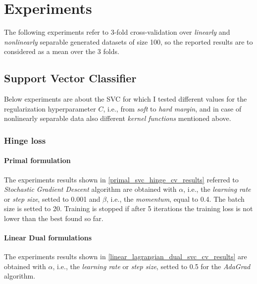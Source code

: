 \section{Experiments}

The following experiments refer to 3-fold cross-validation over \emph{linearly} and \emph{nonlinearly} separable generated datasets of size 100, so the reported results are to considered as a mean over the 3 folds.

\subsection{Support Vector Classifier}

Below experiments are about the SVC for which I tested different values for the regularization hyperparameter $C$, i.e., from \emph{soft} to \emph{hard margin}, and in case of nonlinearly separable data also different \emph{kernel functions} mentioned above.

\subsubsection{Hinge loss}

\paragraph{Primal formulation}

The experiments results shown in \ref{primal_svc_hinge_cv_results} referred to \emph{Stochastic Gradient Descent} algorithm are obtained with $\alpha$, i.e., the \emph{learning rate} or \emph{step size}, setted to 0.001 and $\beta$, i.e., the \emph{momentum}, equal to 0.4. The batch size is setted to 20. Training is stopped if after 5 iterations the training loss is not lower than the best found so far.



\paragraph{Linear Dual formulations}

The experiments results shown in \ref{linear_lagrangian_dual_svc_cv_results} are obtained with $\alpha$, i.e., the \emph{learning rate} or \emph{step size}, setted to 0.5 for the \emph{AdaGrad} algorithm.





